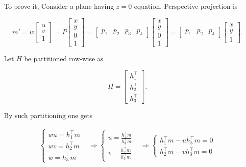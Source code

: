 \documentclass[10pt]{report}
\begin{document}
To prove it, Consider a plane having \(z = 0\) equation. Perspective
projection is

\[ m' = w\begin{bmatrix} u \\ v \\ 1\end{bmatrix} = P\begin{bmatrix} x \\ y \\ 0 \\ 1 \end{bmatrix} = \begin{bmatrix}p_1 & p_2 & p_3 & p_4 \end{bmatrix} \begin{bmatrix} x \\ y \\ 0 \\ 1\end{bmatrix} = \begin{bmatrix}p_1 & p_2 & p_4\end{bmatrix} \begin{bmatrix} x \\ y \\ 1\end{bmatrix}.\]

Let \(H\) be partitioned row-wise as

\[H = \begin{bmatrix} h_1^\top\\ h_2^\top\\ h_3^\top\end{bmatrix}.\]

By such partitioning one gets

\[ \begin{array}{lllll} \left\{ \begin{array}{l} wu = h_1^\top m\\ wv = h_2^\top m\\ w = h_3^\top m \end{array} \right. & \Rightarrow \left\{ \begin{array}{l} u = \frac{h_1^\top m}{h_3^\top m}\\ v = \frac{h_2^\top m}{h_3^\top m} \end{array} \right. & \Rightarrow \left\{ \begin{array}{l} h_1^\top m - uh_3^\top m = 0\\ h_2^\top m - vh_3^\top m = 0 \end{array} \right. \end{array} \]
\end{document}

